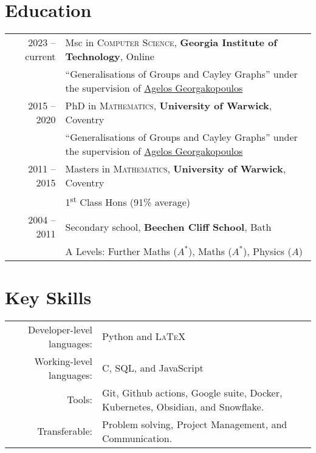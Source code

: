 \documentclass[a4paper,10pt]{article}
\begin{document}
\section{Education}
\begin{tabular}{rl}
	\textsc{} 2023 -- current & Msc in \textsc{Computer Science}, \textbf{Georgia Institute of Technology}, Online\\
	& ``Generalisations of Groups and Cayley Graphs'' under the supervision of \href{https://homepages.warwick.ac.uk/~maslar/}{Agelos Georgakopoulos}\\
	\textsc{} 2015 -- 2020 & PhD in \textsc{Mathematics}, \textbf{University of Warwick}, Coventry\\
	& ``Generalisations of Groups and Cayley Graphs'' under the supervision of \href{https://homepages.warwick.ac.uk/~maslar/}{Agelos Georgakopoulos}\\
	\textsc{} 2011 -- 2015& Masters in \textsc{Mathematics}, \textbf{University of Warwick}, Coventry\\
	& 1\textsuperscript{st} Class Hons (91\% average)\\
	\textsc{} 2004 -- 2011& Secondary school, \textbf{Beechen Cliff School}, Bath\\
	&  A Levels: Further Maths ($A^{\ast}$), Maths ($A^{\ast}$), Physics ($A$)
\end{tabular}

\vspace{-0.05 in}

\section{Key Skills}
\begin{tabular}{rl}
	Developer-level languages: &  Python and \textsc{LaTeX}\\
	Working-level languages: & C, SQL, and JavaScript\\
	Tools: & Git, Github actions, Google suite, Docker, Kubernetes, Obsidian, and Snowflake.\\
	Transferable: & Problem solving, Project Management, and Communication.\\
\end{tabular}
\vspace{-0.05 in}
\end{document}
